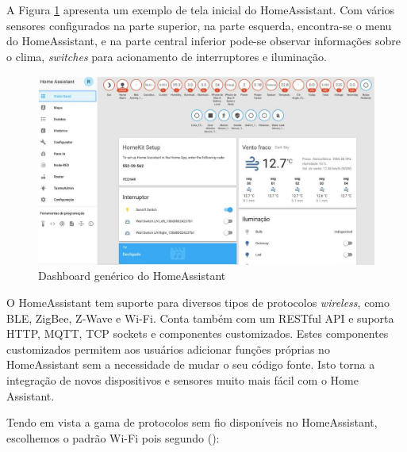 A Figura \ref{fig:homeassistant-dash} apresenta um exemplo de tela inicial do HomeAssistant. Com vários sensores configurados na parte superior, na parte esquerda, encontra-se o menu do HomeAssistant, e na parte central inferior pode-se observar informações sobre o clima, \textit{switches} para acionamento de interruptores e iluminação.

\begin{figure}[htbp]
	\centering
	\includegraphics[width=1\linewidth]{figuras/homeassistant-dash.png}
	\caption{Dashboard genérico do HomeAssistant}
	\label{fig:homeassistant-dash}
\end{figure}

O HomeAssistant tem suporte para diversos tipos de protocolos \textit{wireless}, como BLE, ZigBee, Z-Wave e Wi-Fi. Conta também com um RESTful API e suporta HTTP, MQTT, TCP sockets e componentes customizados. Estes componentes customizados permitem aos usuários adicionar funções próprias no HomeAssistant sem a necessidade de mudar o seu código fonte. Isto torna a integração de novos dispositivos e sensores muito mais fácil com o Home Assistant. \cite{Gomes2018}



Tendo em vista a gama de protocolos sem fio disponíveis no HomeAssistant, escolhemos o padrão Wi-Fi pois segundo \citeauthor{Lundrigan2017} (\citeyear{Lundrigan2017}):

